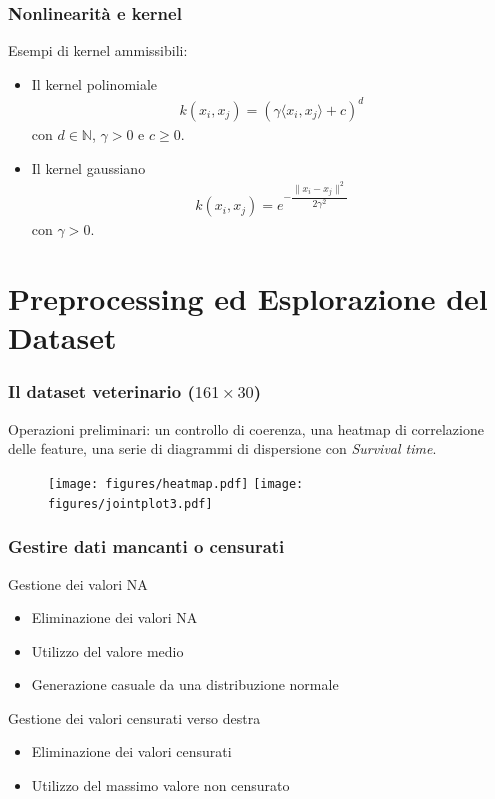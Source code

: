 \documentclass[table]{beamer}
\newcommand*{\sectionp}{\usebeamertemplate*{section p}}
\newcommand{\nologo}{\setbeamertemplate{logo}{}}
\begin{document}
\begin{frame}
\frametitle{Nonlinearità e kernel}
Esempi di kernel ammissibili:
\begin{itemize}
\item Il kernel polinomiale \begin{align*}
k(x_{i},x_{j}) = (\gamma\langle x_{i},x_{j} \rangle + c)^{d}
\end{align*}
con $ d \in \mathbb{N} $, $ \gamma > 0 $ e $ c \geq 0 $.
\item Il kernel gaussiano \begin{align*}
k(x_{i},x_{j}) = e^{-\dfrac{\| x_{i}-x_{j} \|^{2}}{2\gamma^{2}}}
\end{align*}
con $ \gamma > 0 $.
\end{itemize}
\end{frame}

\section{Preprocessing ed Esplorazione del Dataset}
\frame{\sectionp}

{\nologo
\begin{frame}
\frametitle{Il dataset veterinario ($ 161 \times 30$)}
Operazioni preliminari: un controllo di coerenza, una heatmap di correlazione delle feature, una serie di diagrammi di dispersione con \textit{Survival time}.
\begin{figure}[h]
  \vspace{-0.2cm}
  \centering
  	\texttt{[image: figures/heatmap.pdf]}
  	\texttt{[image: figures/jointplot3.pdf]}
\end{figure}
\end{frame}}

\begin{frame}
\frametitle{Gestire dati mancanti o censurati}
Gestione dei valori NA
\begin{itemize}
\item Eliminazione dei valori NA
\item Utilizzo del valore medio
\item Generazione casuale da una distribuzione normale
\end{itemize}
\vspace{0.4cm}
Gestione dei valori censurati verso destra
\begin{itemize}
\item Eliminazione dei valori censurati
\item Utilizzo del massimo valore non censurato
\end{itemize}
\end{frame}
\end{document}
